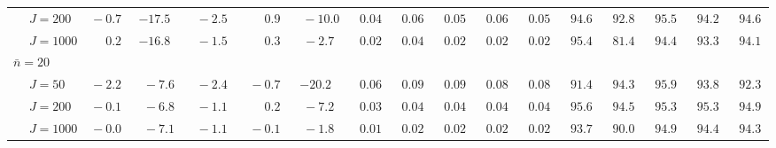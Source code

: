 \begin{sidewaystable}
\begin{threeparttable}
\begin{tabular}{llccccccccccccccc}
 & \nopagebreak $\;J=200$  & $\phantom{0}{-}0.7\phantom{0}$ & ${-}17.5\phantom{0}$ & $\phantom{0}{-}2.5\phantom{0}$ & $\phantom{0}\phantom{-}0.9\phantom{0}$ & $\phantom{0}{-}10.0\phantom{0}$ & $\phantom{0}0.04\phantom{0}$ & $\phantom{0}0.06\phantom{0}$ & $\phantom{0}0.05\phantom{0}$ & $\phantom{0}0.06\phantom{0}$ & $\phantom{0}0.05\phantom{0}$ & $\phantom{0}94.6\phantom{0}$ & $\phantom{0}92.8\phantom{0}$ & $\phantom{0}95.5\phantom{0}$ & $\phantom{0}94.2\phantom{0}$ & $\phantom{0}94.6\phantom{0}$ \\
 & \nopagebreak $\;J=1000$  & $\phantom{0}\phantom{-}0.2\phantom{0}$ & ${-}16.8\phantom{0}$ & $\phantom{0}{-}1.5\phantom{0}$ & $\phantom{0}\phantom{-}0.3\phantom{0}$ & $\phantom{0}{-}2.7\phantom{0}$ & $\phantom{0}0.02\phantom{0}$ & $\phantom{0}0.04\phantom{0}$ & $\phantom{0}0.02\phantom{0}$ & $\phantom{0}0.02\phantom{0}$ & $\phantom{0}0.02\phantom{0}$ & $\phantom{0}95.4\phantom{0}$ & $\phantom{0}81.4\phantom{0}$ & $\phantom{0}94.4\phantom{0}$ & $\phantom{0}93.3\phantom{0}$ & $\phantom{0}94.1\phantom{0}$ \\
\multicolumn{4}{l}{$\bar{n}=20$} \\  & \nopagebreak $\;J=50$  & $\phantom{0}{-}2.2\phantom{0}$ & $\phantom{0}{-}7.6\phantom{0}$ & $\phantom{0}{-}2.4\phantom{0}$ & $\phantom{0}{-}0.7\phantom{0}$ & ${-}20.2\phantom{0}$ & $\phantom{0}0.06\phantom{0}$ & $\phantom{0}0.09\phantom{0}$ & $\phantom{0}0.09\phantom{0}$ & $\phantom{0}0.08\phantom{0}$ & $\phantom{0}0.08\phantom{0}$ & $\phantom{0}91.4\phantom{0}$ & $\phantom{0}94.3\phantom{0}$ & $\phantom{0}95.9\phantom{0}$ & $\phantom{0}93.8\phantom{0}$ & $\phantom{0}92.3\phantom{0}$ \\
 & \nopagebreak $\;J=200$  & $\phantom{0}{-}0.1\phantom{0}$ & $\phantom{0}{-}6.8\phantom{0}$ & $\phantom{0}{-}1.1\phantom{0}$ & $\phantom{0}\phantom{-}0.2\phantom{0}$ & $\phantom{0}{-}7.2\phantom{0}$ & $\phantom{0}0.03\phantom{0}$ & $\phantom{0}0.04\phantom{0}$ & $\phantom{0}0.04\phantom{0}$ & $\phantom{0}0.04\phantom{0}$ & $\phantom{0}0.04\phantom{0}$ & $\phantom{0}95.6\phantom{0}$ & $\phantom{0}94.5\phantom{0}$ & $\phantom{0}95.3\phantom{0}$ & $\phantom{0}95.3\phantom{0}$ & $\phantom{0}94.9\phantom{0}$ \\
 & \nopagebreak $\;J=1000$  & $\phantom{0}{-}0.0\phantom{0}$ & $\phantom{0}{-}7.1\phantom{0}$ & $\phantom{0}{-}1.1\phantom{0}$ & $\phantom{0}{-}0.1\phantom{0}$ & $\phantom{0}{-}1.8\phantom{0}$ & $\phantom{0}0.01\phantom{0}$ & $\phantom{0}0.02\phantom{0}$ & $\phantom{0}0.02\phantom{0}$ & $\phantom{0}0.02\phantom{0}$ & $\phantom{0}0.02\phantom{0}$ & $\phantom{0}93.7\phantom{0}$ & $\phantom{0}90.0\phantom{0}$ & $\phantom{0}94.9\phantom{0}$ & $\phantom{0}94.4\phantom{0}$ & $\phantom{0}94.3\phantom{0}$ \\

\end{tabular}
\end{threeparttable}
\end{sidewaystable}
